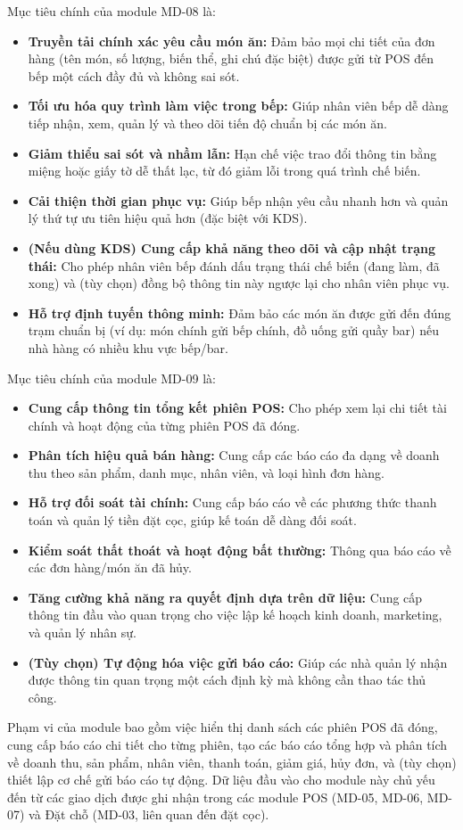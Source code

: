 \label{sssec:md08_objectives_scope}
Mục tiêu chính của module MD-08 là:
\begin{itemize}
    \item \textbf{Truyền tải chính xác yêu cầu món ăn:} Đảm bảo mọi chi tiết của đơn hàng (tên món, số lượng, biến thể, ghi chú đặc biệt) được gửi từ POS đến bếp một cách đầy đủ và không sai sót.
    \item \textbf{Tối ưu hóa quy trình làm việc trong bếp:} Giúp nhân viên bếp dễ dàng tiếp nhận, xem, quản lý và theo dõi tiến độ chuẩn bị các món ăn.
    \item \textbf{Giảm thiểu sai sót và nhầm lẫn:} Hạn chế việc trao đổi thông tin bằng miệng hoặc giấy tờ dễ thất lạc, từ đó giảm lỗi trong quá trình chế biến.
    \item \textbf{Cải thiện thời gian phục vụ:} Giúp bếp nhận yêu cầu nhanh hơn và quản lý thứ tự ưu tiên hiệu quả hơn (đặc biệt với KDS).
    \item \textbf{(Nếu dùng KDS) Cung cấp khả năng theo dõi và cập nhật trạng thái:} Cho phép nhân viên bếp đánh dấu trạng thái chế biến (đang làm, đã xong) và (tùy chọn) đồng bộ thông tin này ngược lại cho nhân viên phục vụ.
    \item \textbf{Hỗ trợ định tuyến thông minh:} Đảm bảo các món ăn được gửi đến đúng trạm chuẩn bị (ví dụ: món chính gửi bếp chính, đồ uống gửi quầy bar) nếu nhà hàng có nhiều khu vực bếp/bar.
\end{itemize}

\label{sssec:md09_objectives_scope}
Mục tiêu chính của module MD-09 là:
\begin{itemize}
    \item \textbf{Cung cấp thông tin tổng kết phiên POS:} Cho phép xem lại chi tiết tài chính và hoạt động của từng phiên POS đã đóng.
    \item \textbf{Phân tích hiệu quả bán hàng:} Cung cấp các báo cáo đa dạng về doanh thu theo sản phẩm, danh mục, nhân viên, và loại hình đơn hàng.
    \item \textbf{Hỗ trợ đối soát tài chính:} Cung cấp báo cáo về các phương thức thanh toán và quản lý tiền đặt cọc, giúp kế toán dễ dàng đối soát.
    \item \textbf{Kiểm soát thất thoát và hoạt động bất thường:} Thông qua báo cáo về các đơn hàng/món ăn đã hủy.
    \item \textbf{Tăng cường khả năng ra quyết định dựa trên dữ liệu:} Cung cấp thông tin đầu vào quan trọng cho việc lập kế hoạch kinh doanh, marketing, và quản lý nhân sự.
    \item \textbf{(Tùy chọn) Tự động hóa việc gửi báo cáo:} Giúp các nhà quản lý nhận được thông tin quan trọng một cách định kỳ mà không cần thao tác thủ công.
\end{itemize}
Phạm vi của module bao gồm việc hiển thị danh sách các phiên POS đã đóng, cung cấp báo cáo chi tiết cho từng phiên, tạo các báo cáo tổng hợp và phân tích về doanh thu, sản phẩm, nhân viên, thanh toán, giảm giá, hủy đơn, và (tùy chọn) thiết lập cơ chế gửi báo cáo tự động. Dữ liệu đầu vào cho module này chủ yếu đến từ các giao dịch được ghi nhận trong các module POS (MD-05, MD-06, MD-07) và Đặt chỗ (MD-03, liên quan đến đặt cọc).

